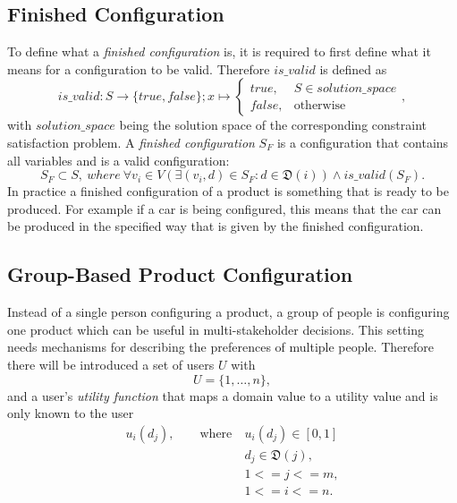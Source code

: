 \subsection{Finished Configuration}
To define what a \emph{finished configuration} is, it is required to first define what it means for a configuration to be valid. Therefore $is\_valid$ is defined as
\begin{equation} \label{eq:Foundations:ProductConfiguration:IsValid}
    is\_valid : S \to \{true, false\}; x \mapsto 
    \begin{cases}
        true, & S \in solution\_space \\
        false, & \text{otherwise}
    \end{cases},
\end{equation}
with $solution\_space$ being the solution space of the corresponding constraint satisfaction problem. A \emph{finished configuration} $S_F$ is a configuration that contains all variables and is a valid configuration:
\begin{equation} \label{eq:Foundations:ProductConfiguration:FinishedConfiguration}
    S_F \subset S,\ where \ \forall v_i \in V (\exists (v_i, d) \in S_F : d \in \mathfrak{D}(i)) \land is\_valid(S_F).
\end{equation}
In practice a finished configuration of a product is something that is ready to be produced. For example if a car is being configured, this means that the car can be produced in the specified way that is given by the finished configuration.


\subsection{Group-Based Product Configuration}
\label{sec:Foundations:GroupBasedProductConfiguration}

Instead of a single person configuring a product, a group of people is configuring one product which can be useful in multi-stakeholder decisions. This setting needs mechanisms for describing the preferences of multiple people. Therefore there will be introduced a set of users $U$ with
\begin{equation}\label{eq:Foundations:ProductConfiguration:Users}
    U = \{1, \dotsc, n\},
\end{equation}
and a user's \emph{utility function} that maps a domain value to a utility value and is only known to the user
\begin{equation}
    \begin{split}
        u_i(d_j), \qquad \text{where}\ & u_i(d_j) \in [0,1] \\
        & d_j \in  \mathfrak{D}(j),\\
        & 1 <= j <= m, \\
        & 1 <= i <= n.
    \end{split}
\end{equation}

